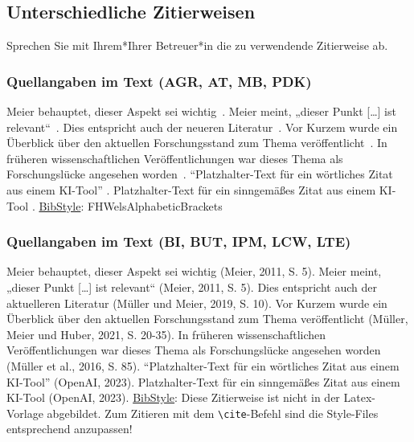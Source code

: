 \subsection{Unterschiedliche Zitierweisen}
\label{sec: ZitierStil}
Sprechen Sie mit Ihrem*Ihrer Betreuer*in die zu verwendende Zitierweise ab.

\subsubsection{Quellangaben im Text (AGR, AT, MB, PDK)}
Meier behauptet, dieser Aspekt sei wichtig~.\newline
Meier meint, „dieser Punkt […] ist relevant“~.\newline
Dies entspricht auch der neueren Literatur~.\newline
Vor Kurzem wurde ein Überblick über den aktuellen Forschungsstand zum Thema veröffentlicht~.\newline
In früheren wissenschaftlichen Veröffentlichungen war dieses Thema als Forschungslücke angesehen worden~.\newline
"`Platzhalter-Text für ein wörtliches Zitat aus einem KI-Tool"' .\newline 
Platzhalter-Text für ein sinngemäßes Zitat aus einem KI-Tool .\newline
\underline{BibStyle}: \textsf{FHWelsAlphabeticBrackets}


\subsubsection{Quellangaben im Text (BI, BUT, IPM, LCW, LTE)}
Meier behauptet, dieser Aspekt sei wichtig (Meier, 2011, S. 5).\newline
Meier meint, „dieser Punkt […] ist relevant“ (Meier, 2011, S. 5).\newline
Dies entspricht auch der aktuelleren Literatur (Müller und Meier, 2019, S. 10).\newline
Vor Kurzem wurde ein Überblick über den aktuellen Forschungsstand zum Thema veröffentlicht 
(Müller, Meier und Huber, 2021, S. 20-35).\newline
In früheren wissenschaftlichen Veröffentlichungen war dieses Thema als Forschungslücke angesehen worden (Müller et al., 2016, S. 85).\newline
"`Platzhalter-Text für ein wörtliches Zitat aus einem KI-Tool"' (OpenAI, 2023).\newline 
Platzhalter-Text für ein sinngemäßes Zitat aus einem KI-Tool (OpenAI, 2023).\newline
\underline{BibStyle}: Diese Zitierweise ist nicht in der Latex-Vorlage abgebildet. Zum Zitieren mit dem
\verb|\cite|-Befehl sind die Style-Files entsprechend anzupassen!


